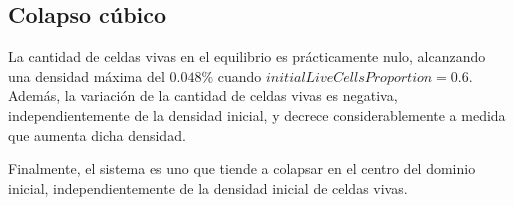 \subsection{Colapso cúbico}\label{subsec:colapso-cubico-conc}
La cantidad de celdas vivas en el equilibrio es prácticamente nulo, alcanzando una densidad máxima del
$0.048\%$ cuando $initialLiveCellsProportion = 0.6$.
Además, la variación de la cantidad de celdas vivas es negativa, independientemente de la densidad inicial,
y decrece considerablemente a medida que aumenta dicha densidad.

Finalmente, el sistema es uno que tiende a colapsar en el centro del dominio inicial, independientemente de la densidad inicial de celdas vivas.